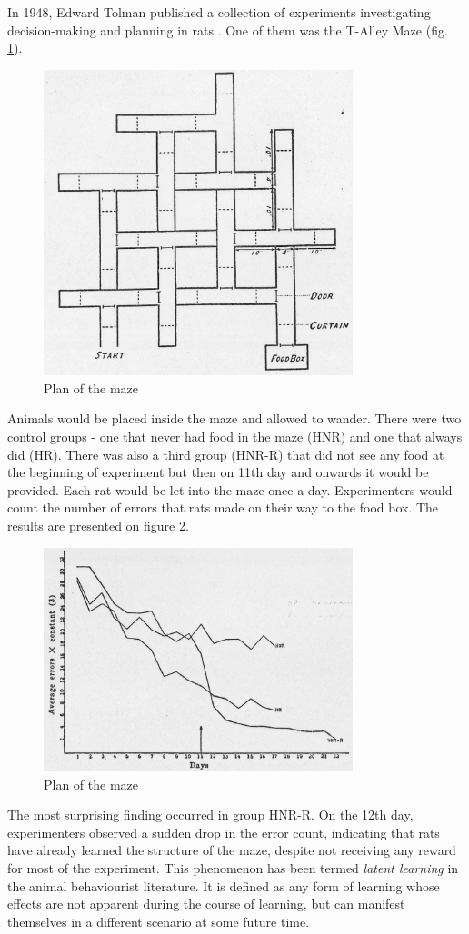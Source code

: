 \documentclass[oneside,english,logo]{amuthesis}
\begin{document}
In 1948, Edward Tolman published a collection of experiments investigating decision-making and planning in rats \cite{cog_maps_tolman}. One of them was the T-Alley Maze (fig. \ref{fig:tolman_maze}).
\begin{figure}[!htbp]
	\centering
	\includegraphics[width=9cm]{tolman_maze}
	\caption{Plan of the maze}
	\label{fig:tolman_maze}
\end{figure}
Animals would be placed inside the maze and allowed to wander. There were two control groups - one that never had food in the maze (HNR) and one that always did (HR). There was also a third group (HNR-R) that did not see any food at the beginning of experiment but then on 11th day and onwards it would be provided. Each rat would be let into the maze once a day. Experimenters would count the number of errors that rats made on their way to the food box. The results are presented on figure \ref{fig:tolman_maze_results}.
\begin{figure}[!htbp]
	\centering
	\includegraphics[width=9cm]{tolman_maze_results}
	\caption{Plan of the maze}
	\label{fig:tolman_maze_results}
\end{figure}
The most surprising finding occurred in group HNR-R. On the 12th day, experimenters observed a sudden drop in the error count, indicating that rats have already learned the structure of the maze, despite not receiving any reward for most of the experiment. This phenomenon has been termed \textit{latent learning} in the animal behaviourist literature. It is defined as any form of learning whose effects are not apparent during the course of learning, but can manifest themselves in a different scenario at some future time.
\end{document}
